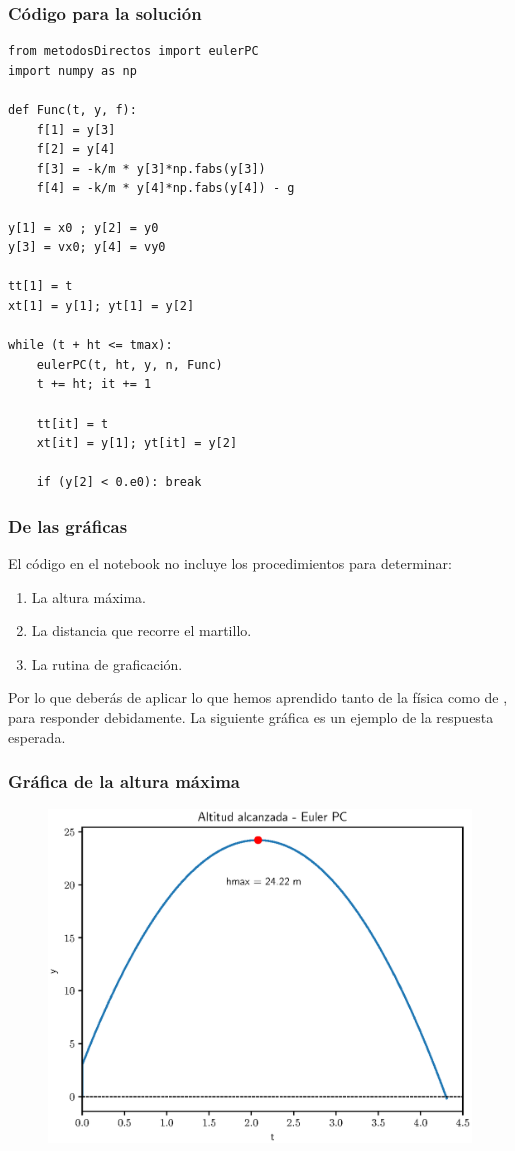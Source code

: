 \documentclass[12pt]{beamer}
\begin{document}
\begin{frame}
\frametitle{Código para la solución}
\begin{lstlisting}[caption=Código con el método Corrector-Predictor de Euler]
from metodosDirectos import eulerPC
import numpy as np

def Func(t, y, f):
    f[1] = y[3]
    f[2] = y[4]
    f[3] = -k/m * y[3]*np.fabs(y[3])
    f[4] = -k/m * y[4]*np.fabs(y[4]) - g

y[1] = x0 ; y[2] = y0
y[3] = vx0; y[4] = vy0

tt[1] = t
xt[1] = y[1]; yt[1] = y[2]

while (t + ht <= tmax):
    eulerPC(t, ht, y, n, Func)
    t += ht; it += 1
   
    tt[it] = t
    xt[it] = y[1]; yt[it] = y[2]
   
    if (y[2] < 0.e0): break
\end{lstlisting}
\end{frame}
\begin{frame}
\frametitle{De las gráficas}
El código en el notebook no incluye los procedimientos para determinar:
\begin{enumerate}[<+->]
\item La altura máxima.
\item La distancia que recorre el martillo.
\item La rutina de graficación.
\end{enumerate}
\pause
Por lo que deberás de aplicar lo que hemos aprendido tanto de la física como de \python, para responder debidamente. La siguiente gráfica es un ejemplo de la respuesta esperada.
\end{frame}
\begin{frame}
\frametitle{Gráfica de la altura máxima}
\begin{figure}
    \centering
    \includegraphics[scale=0.55]{Imagenes/plot_eulerPC_ejercicio_02_02.eps}
\end{figure}
\end{frame}
\end{document}
